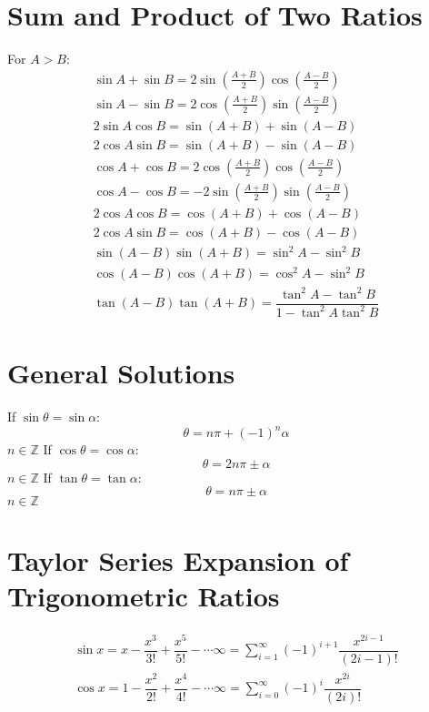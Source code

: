 \section{Sum and Product of Two Ratios}
For $A>B$:
\begin{align}
	\sin A+\sin B=2 \sin \left(\frac{A+B}{2}\right)\cos \left(\frac{A-B}{2}\right)\\
	\sin A-\sin B=2 \cos \left(\frac{A+B}{2}\right)\sin \left(\frac{A-B}{2}\right)\\
	2\sin A\cos B=\sin(A+B)+\sin(A-B)\\
	2\cos A\sin B=\sin(A+B)-\sin(A-B)\\
	\cos A+\cos B=2 \cos \left(\frac{A+B}{2}\right)\cos \left(\frac{A-B}{2}\right)\\
	\cos A-\cos B=-2 \sin \left(\frac{A+B}{2}\right)\sin \left(\frac{A-B}{2}\right)\\
	2 \cos A\cos B=\cos (A+B)+\cos (A-B)\\
	2 \cos A\sin B=\cos (A+B)-\cos (A-B)\\
	\sin (A-B)\sin(A+B)=\sin^2 A-\sin^2 B\\
	\cos (A-B)\cos(A+B)=\cos^2 A-\sin^2 B\\
	\tan (A-B)\tan(A+B)=\dfrac{\tan^2 A-\tan^2 B}{1-\tan^2 A\tan^2 B}
\end{align}

\section{General Solutions}
If $\sin \theta=\sin \alpha$:
\begin{equation}
	\theta=n\pi+(-1)^n\alpha
\end{equation}$n\in\mathbb{Z}$\newline
If $\cos \theta=\cos \alpha$:
\begin{equation}
	\theta=2n\pi\pm\alpha
\end{equation}$n\in\mathbb{Z}$\newline
If $\tan \theta=\tan \alpha$:
\begin{equation}
	\theta=n\pi\pm\alpha
\end{equation}$n\in\mathbb{Z}$

\section{Taylor Series Expansion of Trigonometric Ratios}
\begin{align}
	\sin x=x-\dfrac{x^3}{3!}+\dfrac{x^5}{5!}-\cdots\infty=\sum_{i=1}^\infty (-1)^{i+1}\dfrac{x^{2i-1}}{(2i-1)!}\\
	\cos x=1-\dfrac{x^2}{2!}+\dfrac{x^4}{4!}-\cdots\infty=\sum_{i=0}^\infty (-1)^i\dfrac{x^{2i}}{(2i)!}
\end{align}
